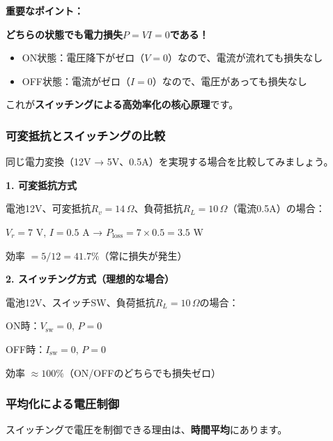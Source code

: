 \begin{screen}
\textbf{重要なポイント：}

\textbf{どちらの状態でも電力損失$P = VI = 0$である！}

\begin{itemize}
\item ON状態：電圧降下がゼロ（$V=0$）なので、電流が流れても損失なし
\item OFF状態：電流がゼロ（$I=0$）なので、電圧があっても損失なし
\end{itemize}

これが\textbf{スイッチングによる高効率化の核心原理}です。
\end{screen}

\subsubsection{可変抵抗とスイッチングの比較}

同じ電力変換（12V → 5V、0.5A）を実現する場合を比較してみましょう。

\textbf{1. 可変抵抗方式}

電池12V、可変抵抗$R_v=14\,\Omega$、負荷抵抗$R_L=10\,\Omega$（電流0.5A）の場合：

$V_r = 7$ V, $I = 0.5$ A → $P_{\text{loss}} = 7 \times 0.5 = 3.5$ W

効率 $= 5/12 = 41.7\%$（常に損失が発生）

\textbf{2. スイッチング方式（理想的な場合）}

電池12V、スイッチSW、負荷抵抗$R_L=10\,\Omega$の場合：

ON時：$V_{\text{sw}}=0$, $P=0$

OFF時：$I_{\text{sw}}=0$, $P=0$

効率 $\approx 100\%$（ON/OFFのどちらでも損失ゼロ）

\subsubsection{平均化による電圧制御}

スイッチングで電圧を制御できる理由は、\textbf{時間平均}にあります。

